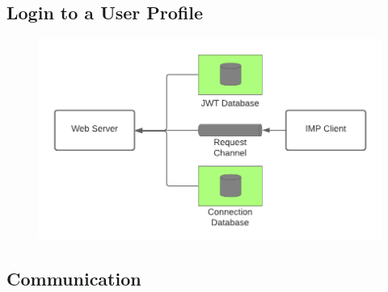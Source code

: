 \subsection{Login to a User Profile}

\begin{figure}[h]
    \centering
    \includegraphics[scale=0.3]{Diagrams/Integration Architecture 1/Overview/Login.png}
\end{figure}

\subsection{Communication}